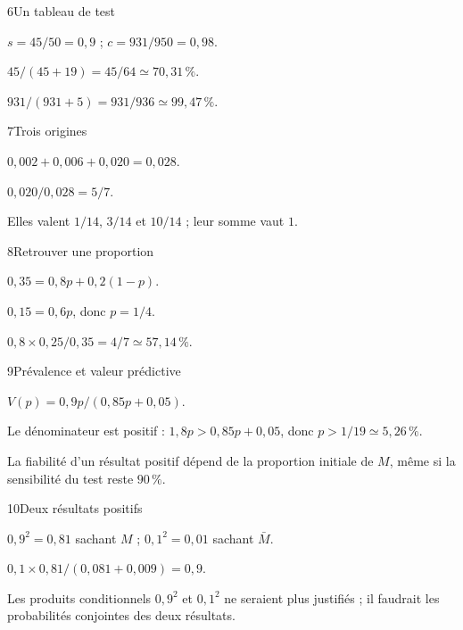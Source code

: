 \begin{corrige}{6}{Un tableau de test}
\begin{questions}
\item $s=45/50=0{,}9$ ; $c=931/950=0{,}98$.
\item $45/(45+19)=45/64\simeq70{,}31\,\%$.
\item $931/(931+5)=931/936\simeq99{,}47\,\%$.
\end{questions}
\end{corrige}
\begin{corrige}{7}{Trois origines}
\begin{questions}
\item $0{,}002+0{,}006+0{,}020=0{,}028$.
\item $0{,}020/0{,}028=5/7$.
\item Elles valent $1/14$, $3/14$ et $10/14$ ; leur somme vaut $1$.
\end{questions}
\end{corrige}
\begin{corrige}{8}{Retrouver une proportion}
\begin{questions}
\item $0{,}35=0{,}8p+0{,}2(1-p)$.
\item $0{,}15=0{,}6p$, donc $p=1/4$.
\item $0{,}8\times0{,}25/0{,}35=4/7\simeq57{,}14\,\%$.
\end{questions}
\end{corrige}
\begin{corrige}{9}{Prévalence et valeur prédictive}
\begin{questions}
\item $V(p)=0{,}9p/(0{,}85p+0{,}05)$.
\item Le dénominateur est positif : $1{,}8p>0{,}85p+0{,}05$, donc $p>1/19\simeq5{,}26\,\%$.
\item La fiabilité d’un résultat positif dépend de la proportion initiale de $M$, même si la sensibilité du test reste $90\,\%$.
\end{questions}
\end{corrige}
\begin{corrige}{10}{Deux résultats positifs}
\begin{questions}
\item $0{,}9^2=0{,}81$ sachant $M$ ; $0{,}1^2=0{,}01$ sachant $\bar M$.
\item $0{,}1\times0{,}81/(0{,}081+0{,}009)=0{,}9$.
\item Les produits conditionnels $0{,}9^2$ et $0{,}1^2$ ne seraient plus justifiés ; il faudrait les probabilités conjointes des deux résultats.
\end{questions}
\end{corrige}

